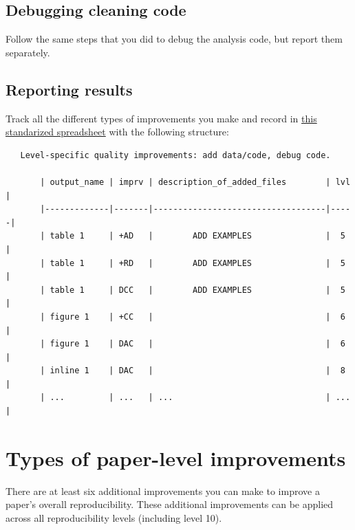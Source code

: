 \documentclass[]{book}
\begin{document}
\hypertarget{debugging-cleaning-code}{%
\subsection{Debugging cleaning code}\label{debugging-cleaning-code}}

Follow the same steps that you did to debug the analysis code, but report them separately.

\hypertarget{reporting-results}{%
\subsection{Reporting results}\label{reporting-results}}

Track all the different types of improvements you make and record in \href{https://docs.google.com/spreadsheets/d/1LUIdVFH0OfR70C7z07TYeE-uWzKI_JIeWUMaYhqEKK0/edit\#gid=0\&range=A3}{this standarized spreadsheet} with the following structure:

\begin{verbatim}
   Level-specific quality improvements: add data/code, debug code.

       | output_name | imprv | description_of_added_files        | lvl |
       |-------------|-------|-----------------------------------|-----|
       | table 1     | +AD   |        ADD EXAMPLES               |  5  |
       | table 1     | +RD   |        ADD EXAMPLES               |  5  |
       | table 1     | DCC   |        ADD EXAMPLES               |  5  |
       | figure 1    | +CC   |                                   |  6  |
       | figure 1    | DAC   |                                   |  6  |
       | inline 1    | DAC   |                                   |  8  |
       | ...         | ...   | ...                               | ... |  
\end{verbatim}

\hypertarget{paper-level}{%
\section{Types of paper-level improvements}\label{paper-level}}

There are at least six additional improvements you can make to improve a paper's overall reproducibility. These additional improvements can be applied across all reproducibility levels (including level 10).
\end{document}
